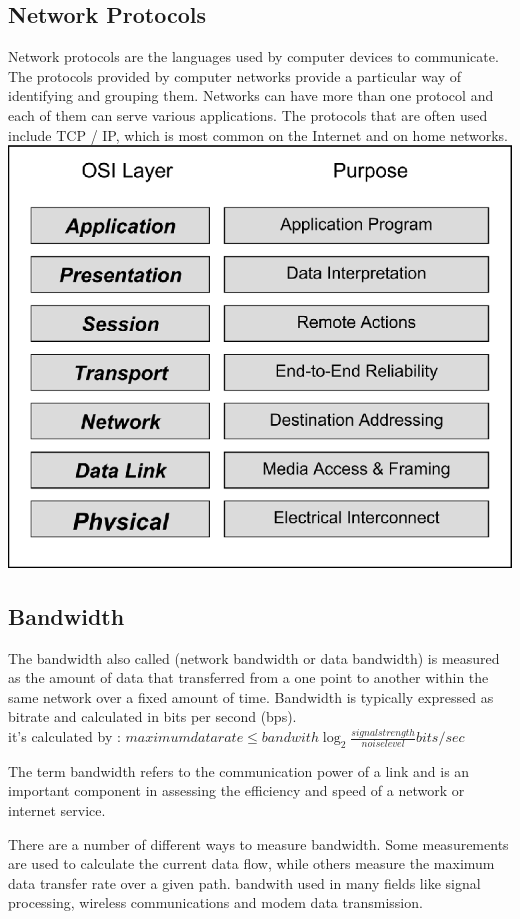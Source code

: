 \documentclass[12pt]{article}
\begin{document}
\subsection{Network Protocols} 
Network protocols are the languages used by computer devices to communicate. The protocols provided by computer networks provide a particular way of identifying and grouping them. Networks can have more than one protocol and each of them can serve various applications. The protocols that are often used include TCP / IP, which is most common on the Internet and on home networks.
\cite{6}
\includegraphics[scale=0.3]{The-layers-of-the-ISO-OSI-model-and-their-purposes-in-the-ISO-IEC-EN-14908-standard.png}
\subsection{Bandwidth}
The bandwidth also called (network bandwidth or data bandwidth) is measured as the amount of data that transferred from a one point to another within the same network over a fixed amount of time. Bandwidth is typically expressed as bitrate and calculated in bits per second (bps).\\
it's calculated by : $maximumdatarate\leq bandwith\log_{2} \frac{signal strength}{noise level} bits/sec$

The term bandwidth refers to the communication power of a link and is an important component in assessing the efficiency and speed of a network or internet service. 

There are a number of different ways to measure bandwidth. Some measurements are used to calculate the current data flow, while others measure the maximum data transfer rate over a given path.
bandwith used in many fields like signal processing, wireless communications and modem data transmission. \cite{7}
\end{document}
